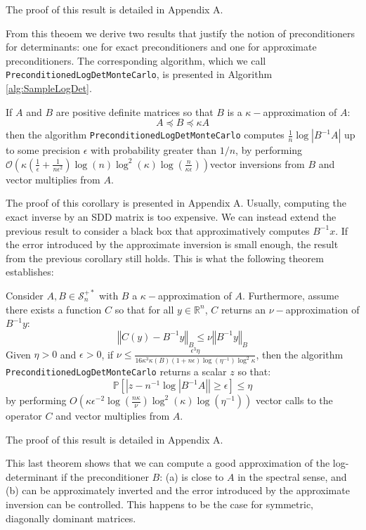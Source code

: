 The proof of this result is detailed in Appendix A.

From this theoem we derive two results that justify the notion of
preconditioners for determinants: one for exact preconditioners and
one for approximate preconditioners. The corresponding algorithm,
which we call \texttt{PreconditionedLogDetMonteCarlo}, is presented
in Algorithm \ref{alg:SampleLogDet}.

\begin{corollary} \label{cor:preconditioning}If $A$ and $B$ are
positive definite matrices so that $B$ is a $\kappa-$approximation
of $A$: 
\begin{equation}
A\preceq B\preceq\kappa A\label{eq:A-B-bounds}
\end{equation}
then the algorithm \texttt{PreconditionedLogDetMonteCarlo} computes
$\frac{1}{n}\log\left|B^{-1}A\right|$ up to some precision $\epsilon$
with probability greater than $1/n$, by performing $\mathcal{O}\left(\kappa\left(\frac{1}{\epsilon}+\frac{1}{n\epsilon^{2}}\right)\log\left(n\right)\log^{2}\left(\kappa\right)\log\left(\frac{n}{\kappa\epsilon}\right)\right)$vector
inversions from $B$ and vector multiplies from $A$.

\end{corollary}

The proof of this corollary is presented in Appendix A. Usually, computing
the exact inverse by an SDD matrix is too expensive. We can instead
extend the previous result to consider a black box that approximatively
computes $B^{-1}x$. If the error introduced by the approximate inversion
is small enough, the result from the previous corollary still holds.
This is what the following theorem establishes:

\begin{theorem}\label{thm:preconditioning-approx}Consider $A,B\in\mathcal{S}_{n}^{+*}$
with $B$ a $\kappa-$approximation of $A$. Furthermore, assume there
exists a function $C$ so that for all $y\in\mathbb{R}^{n}$, $C$
returns an $\nu-$approximation of $B^{-1}y$:
\[
\left\Vert C\left(y\right)-B^{-1}y\right\Vert _{B}\leq\nu\left\Vert B^{-1}y\right\Vert _{B}
\]
Given $\eta>0$ and $\epsilon>0$, if $\nu\leq\frac{\epsilon^{3}\eta}{16\kappa^{3}\kappa\left(B\right)\left(1+n\epsilon\right)\log\left(\eta^{-1}\right)\log^{2}\kappa}$,
then the algorithm \texttt{PreconditionedLogDetMonteCarlo} returns
a scalar $z$ so that:
\[
\mathbb{P}\left[\left|z-n^{-1}\log\left|B^{-1}A\right|\right|\geq\epsilon\right]\leq\eta
\]
by performing $O\left(\kappa\epsilon^{-2}\log\left(\frac{n\kappa}{\nu}\right)\log^{2}\left(\kappa\right)\log\left(\eta^{-1}\right)\right)$
vector calls to the operator $C$ and vector multiplies from $A$. 

\end{theorem}

The proof of this result is detailed in Appendix A.

This last theorem shows that we can compute a good approximation of
the log-determinant if the preconditioner $B$: (a) is close to $A$
in the spectral sense, and (b) can be approximately inverted and the
error introduced by the approximate inversion can be controlled. This
happens to be the case for symmetric, diagonally dominant matrices.
